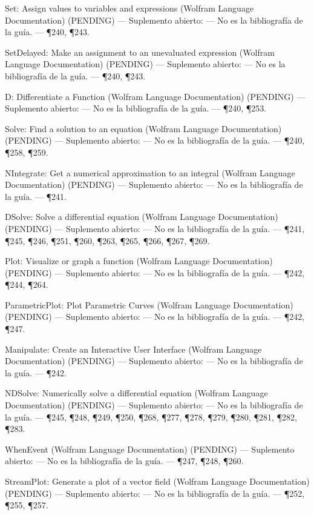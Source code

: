 \documentclass[10pt,openany]{book}
\begin{document}
\noindent Set: Assign values to variables and expressions (Wolfram Language Documentation) (PENDING) --- Suplemento abierto: --- No es la bibliografía de la guía. --- \P240, \P243.\par
\noindent SetDelayed: Make an assignment to an unevaluated expression (Wolfram Language Documentation) (PENDING) --- Suplemento abierto: --- No es la bibliografía de la guía. --- \P240, \P243.\par
\noindent D: Differentiate a Function (Wolfram Language Documentation) (PENDING) --- Suplemento abierto: --- No es la bibliografía de la guía. --- \P240, \P253.\par
\noindent Solve: Find a solution to an equation (Wolfram Language Documentation) (PENDING) --- Suplemento abierto: --- No es la bibliografía de la guía. --- \P240, \P258, \P259.\par
\noindent NIntegrate: Get a numerical approximation to an integral (Wolfram Language Documentation) (PENDING) --- Suplemento abierto: --- No es la bibliografía de la guía. --- \P241.\par
\noindent DSolve: Solve a differential equation (Wolfram Language Documentation) (PENDING) --- Suplemento abierto: --- No es la bibliografía de la guía. --- \P241, \P245, \P246, \P251, \P260, \P263, \P265, \P266, \P267, \P269.\par
\noindent Plot: Visualize or graph a function (Wolfram Language Documentation) (PENDING) --- Suplemento abierto: --- No es la bibliografía de la guía. --- \P242, \P244, \P264.\par
\noindent ParametricPlot: Plot Parametric Curves (Wolfram Language Documentation) (PENDING) --- Suplemento abierto: --- No es la bibliografía de la guía. --- \P242, \P247.\par
\noindent Manipulate: Create an Interactive User Interface (Wolfram Language Documentation) (PENDING) --- Suplemento abierto: --- No es la bibliografía de la guía. --- \P242.\par
\noindent NDSolve: Numerically solve a differential equation (Wolfram Language Documentation) (PENDING) --- Suplemento abierto: --- No es la bibliografía de la guía. --- \P245, \P248, \P249, \P250, \P268, \P277, \P278, \P279, \P280, \P281, \P282, \P283.\par
\noindent WhenEvent (Wolfram Language Documentation) (PENDING) --- Suplemento abierto: --- No es la bibliografía de la guía. --- \P247, \P248, \P260.\par
\noindent StreamPlot: Generate a plot of a vector field (Wolfram Language Documentation) (PENDING) --- Suplemento abierto: --- No es la bibliografía de la guía. --- \P252, \P255, \P257.\par
\end{document}
